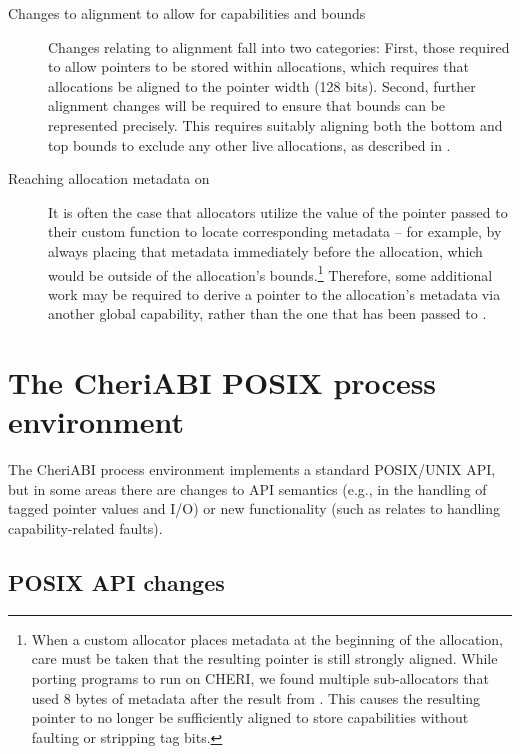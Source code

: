 \documentclass[12pt,twoside,openright,a4paper]{article}
\newcommand{\ccode}[1]{{\small\ttfamily{#1}}}
\newcommand{\cfunc}[1]{{\ccode{#1()}}}
\newcommand{\note}[2]{{\color{blue}[ Note: #1 - #2]}}
\renewcommand{\note}[2]{\relax\ifhmode\unskip\fi}
\newcommand{\arnote}[1]{\note{#1}{Alex R.}}
\begin{document}
\begin{description}
\item[Changes to alignment to allow for capabilities and bounds]
  Changes relating to alignment fall into two categories:
  First, those required to allow pointers to be stored within allocations,
  which requires that allocations be aligned to the pointer width (128 bits).
  Second, further alignment changes will be required to ensure that bounds can
  be represented precisely.
  This requires suitably aligning both the bottom and top bounds to exclude
  any other live allocations, as described in
  .\arnote{May want to switch order of sections?}

\item[Reaching allocation metadata on \cfunc{free}]
  It is often the case that allocators utilize the value of the pointer passed
  to their custom \cfunc{free} function to locate corresponding metadata --
  for example, by always placing that metadata immediately before the
  allocation, which would be outside of the allocation's bounds.\footnote{%
  When a custom allocator places metadata at the beginning of the allocation,
  care must be taken that the resulting pointer is still strongly aligned.
  While porting programs to run on CHERI, we found multiple sub-allocators
  that used 8 bytes of metadata after the result from \cfunc{malloc}.
  This causes the resulting pointer to no longer be sufficiently aligned to
  store capabilities without faulting or stripping tag bits.
  \note{Does CHERI ISAv7 still fault in any of these scenarios?}{nwf}
  }
  Therefore, some additional work may be required to derive a pointer to the
  allocation's metadata via another global capability, rather than the one
  that has been passed to \cfunc{free}.
\end{description}

\section{The CheriABI POSIX process environment}
\label{sec:cheriabi}

The CheriABI process environment implements a standard POSIX/UNIX API, but in
some areas there are changes to API semantics (e.g., in the handling of tagged
pointer values and I/O) or new functionality (such as relates to handling
capability-related faults).

\subsection{POSIX API changes}
\end{document}
